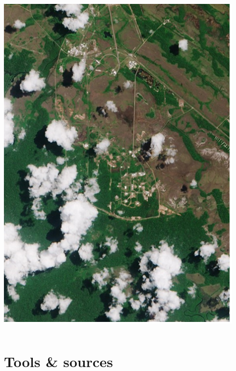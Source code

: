 \documentclass[xcolor=x11names,compress]{beamer}
\renewcommand{\(}{\begin{columns}}
\renewcommand{\)}{\end{columns}}
\newcommand{\<}[1]{\begin{column}{#1}}
\renewcommand{\>}{\end{column}}
\begin{document}
\begin{frame}
\begin{columns}[T]
\begin{column}{0.3\textwidth}
            \includegraphics[width=\textwidth]{Clouds.PNG}
        \end{column}
    \end{columns}
\end{frame}

\section{Tools \& sources}
\end{document}
